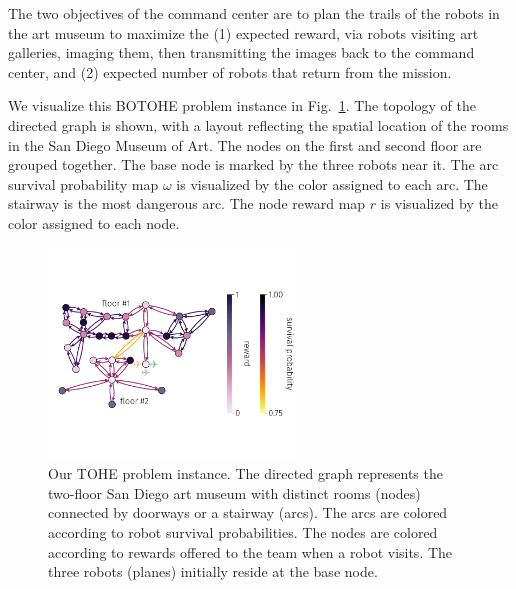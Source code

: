 \documentclass[11pt, oneside]{article}
\begin{document}
The two objectives of the command center are to plan the trails of the robots in the art museum to maximize the (1) expected reward, via robots visiting art galleries, imaging them, then transmitting the images back to the command center, and (2) expected number of robots that return from the mission. 

We visualize this BOTOHE problem instance in Fig.~\ref{fig:ex_setup}. 
The topology of the directed graph is shown, with a layout reflecting the spatial location of the rooms in the San Diego Museum of Art. The nodes on the first and second floor are grouped together.
The base node is marked by the three robots near it.
The arc survival probability map $\omega$ is visualized by the color assigned to each arc.
The stairway is the most dangerous arc.
The node reward map $r$ is visualized by the color assigned to each node. 


\begin{figure}[h!]
    \centering
    	\includegraphics[width=0.6\textwidth]{art_museum_full_setup.pdf}
    \caption{Our TOHE problem instance. The directed graph represents the two-floor San Diego art museum with distinct rooms (nodes) connected by doorways or a stairway (arcs). The arcs are colored according to robot survival probabilities. The nodes are colored according to rewards offered to the team when a robot visits. The three robots (planes) initially reside at the base node. %
    } \label{fig:ex_setup}
\end{figure}
\end{document}
